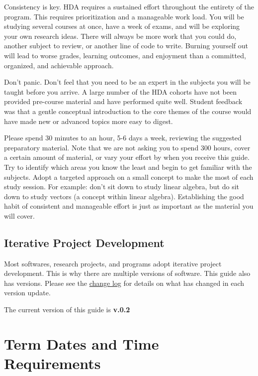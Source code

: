 \documentclass[
]{book}
\begin{document}
Consistency is key. HDA requires a sustained effort throughout the entirety of the program. This requires prioritization and a manageable work load. You will be studying several courses at once, have a week of exams, and will be exploring your own research ideas. There will always be more work that you could do, another subject to review, or another line of code to write. Burning yourself out will lead to worse grades, learning outcomes, and enjoyment than a committed, organized, and achievable approach.

Don't panic. Don't feel that you need to be an expert in the subjects you will be taught before you arrive. A large number of the HDA cohorts have not been provided pre-course material and have performed quite well. Student feedback was that a gentle conceptual introduction to the core themes of the course would have made new or advanced topics more easy to digest.

Please spend 30 minutes to an hour, 5-6 days a week, reviewing the suggested preparatory material. Note that we are not asking you to spend 300 hours, cover a certain amount of material, or vary your effort by when you receive this guide. Try to identify which areas you know the least and begin to get familiar with the subjects. Adopt a targeted approach on a small concept to make the most of each study session. For example: don't sit down to study linear algebra, but do sit down to study vectors (a concept within linear algebra). Establishing the good habit of consistent and manageable effort is just as important as the material you will cover.

\section*{Iterative Project Development}\label{iterative-project-development}

Most softwares, research projects, and programs adopt iterative project development. This is why there are multiple versions of software. This guide also has versions. Please see the \hyperref[change-log]{change log} for details on what has changed in each version update.

The current version of this guide is \textbf{v.0.2}

\chapter{Term Dates and Time Requirements}\label{term-dates-and-time-requirements}
\end{document}
